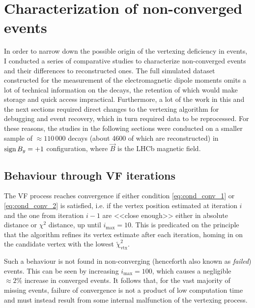 \section{Characterization of non-converged events}
\label{sec:characterization_non_converged}
In order to narrow down the possible origin of the vertexing deficiency in \lambdadecay events, I conducted a series of comparative studies to characterize non-converged events and their differences to reconstructed ones.
The full simulated \demonstratorshort dataset constructed for the measurement of the \lz electromagnetic dipole moments omits a lot of technical information on the decays, the retention of which would make storage and quick access impractical.
Furthermore, a lot of the work in this and the next sections required direct changes to the vertexing algorithm for debugging and event recovery, which in turn required data to be reprocessed.
For these reasons, the studies in the following sections were conducted on a smaller sample of $\approx 110\,000$ \lbz decays (about 4600 of which are reconstructed) in $\operatorname{sign}{B_y} = +1$ configuration, where $\vec{B}$ is the LHCb magnetic field.

\subsection{Behaviour through VF iterations}
\label{sec:oscillation}
The VF process reaches convergence if either condition \eqref{eq:cond_conv_1} or \eqref{eq:cond_conv_2} is satisfied, i.e. if the vertex position estimated at iteration $i$ and the one from iteration $i-1$ are <<close enough>> either in absolute distance or $\chi^2$ distance, up until $i_\text{max} = 10$.
This is predicated on the principle that the algorithm refines its vertex estimate after each iteration, homing in on the candidate vertex with the lowest $\tilde{\chi}^2_\text{vtx}$.

Such a behaviour is not found in non-converging (henceforth also known as \textit{failed}) events.
This can be seen by increasing $i_\text{max}=100$, which causes a negligible $\approx 2\%$ increase in converged events.
It follows that, for the vast majority of missing events, failure of convergence is not a product of low computation time and must instead result from some internal malfunction of the vertexing process.

